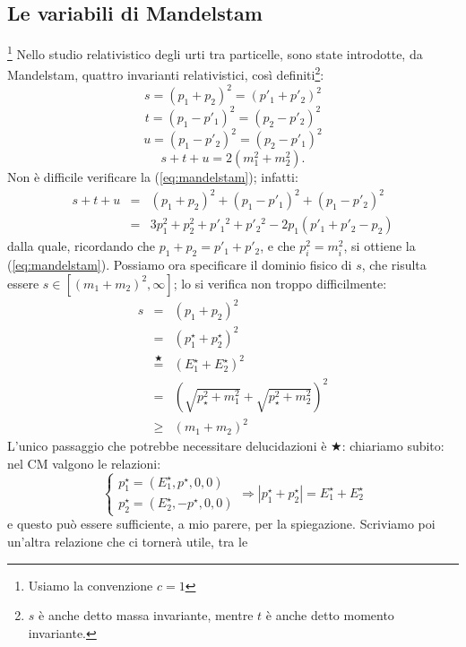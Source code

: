 \subsection{ Le variabili di Mandelstam}
\footnote{ Usiamo la convenzione $c=1$}
Nello studio relativistico degli
urti tra particelle, sono state introdotte, da Mandelstam, quattro
invarianti relativistici, cos\`i definiti\footnote{\(s\) \`e anche detto
massa invariante, mentre \(t\) \`e anche detto momento invariante.}:
$$
s=(p_1+p_2)^2=(p'_1+p'_2)^2
$$
$$
t=(p_1-p'_1)^2=(p_2-p'_2)^2
$$
$$
u=(p_1-p'_2)^2=(p_2-p'_1)^2
$$
\begin{equation}
s+t+u=2(m_1^2+m_2^2). \label{eq:mandelstam}
\end{equation}
Non \`e difficile verificare la (\ref{eq:mandelstam}); infatti:
\begin{eqnarray*}
s+t+u & = & (p_1+p_2)^2+(p_1-p'_1)^2+(p_1-p'_2)^2\\ & =  & 3 p_1^2
+ p_2^2 + p'_1{}^2+p'_2{}^2 - 2 p_1 (p'_1 + p'_2 - p_2)
\end{eqnarray*}
dalla quale, ricordando che $p_1 + p_2 = p'_1 + p'_2$, e che
$p_i^2 = m_i^2$, si ottiene la (\ref{eq:mandelstam}). \newline
Possiamo ora specificare il dominio fisico di $s$, che risulta
essere $s\in[(m_1+m_2)^2,\infty]$; lo si verifica non troppo
difficilmente:
\begin{eqnarray*}
s & = & (p_1+p_2)^2\\
  & = & (p_1^{\star}+p_2^{\star})^2\\
  & \stackrel{\bigstar}{=} & (E_1^{\star}+E_2^{\star})^2\\
  & = & (\sqrt{p_{\star}^2 + m_1^2} + \sqrt{p_{\star}^2 +
  m_2^2})^2\\
  & \geq & (m_1 + m_2)^2
\end{eqnarray*}
L'unico passaggio che potrebbe necessitare delucidazioni \`e
$\bigstar$: chiariamo subito: nel CM valgono le relazioni:
\begin{equation}\left\{\begin{array}{ccc}
p_1^{\star} = (E_1^{\star},p^{\star},0,0)\\
p_2^{\star} = (E_2^{\star},-p^{\star},0,0)
\end{array}\right.\Longrightarrow |p_1^{\star} + p_2^{\star}| =
E_1^{\star} + E_2^{\star} \label{eq:abcd}
\end{equation}
e questo pu\`o essere sufficiente, a mio parere, per la
spiegazione.
\newline
Scriviamo poi un'altra relazione che ci torner\`a utile, tra le
